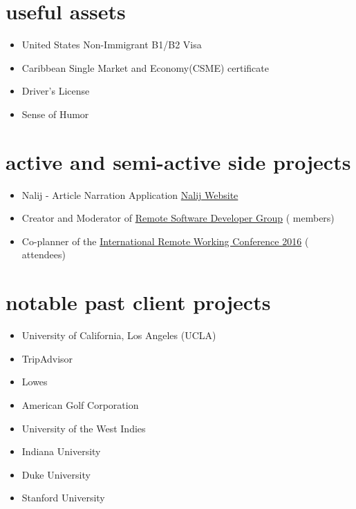 \documentclass[]{friggeri-cv} %
\begin{document}

\section{useful assets}
\begin{itemize}
	\item United States Non-Immigrant B1/B2 Visa
    \item Caribbean Single Market and Economy(CSME) certificate
    \item Driver's License
    \item Sense of Humor
\end{itemize}


\section{active and semi-active side projects}
\begin{itemize}
    \item Nalij - Article Narration Application {\href{https://nalij-api.web.app/}{Nalij Website}}
	\item Creator and Moderator of {\href{http://remotesoftwaredeveloper.com}{Remote Software Developer Group}} ( members)
    \item Co-planner of the {\href{http://remoteworkingconf.com}{International Remote Working Conference 2016}} ( attendees)
\end{itemize}

\section{notable past client projects}
\begin{multicols}{2}
    \begin{itemize}
        \item University of California, Los Angeles (UCLA)
        \item TripAdvisor
        \item Lowes
        \item American Golf Corporation
    \end{itemize}
    \columnbreak
        \begin{itemize}
            \item University of the West Indies
            \item Indiana University
            \item Duke University
            \item Stanford University
        \end{itemize}
\end{multicols}
\end{document}
